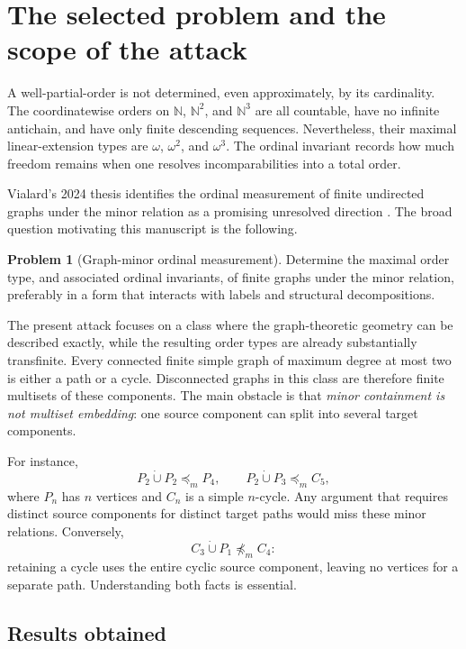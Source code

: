 \documentclass[11pt,letterpaper]{article}
\theoremstyle{plain}
\theoremstyle{definition}
\newtheorem{problem}[problem]{Problem}
\theoremstyle{remark}
\newcommand{\N}{\mathbb N}
\newcommand{\minor}{\preccurlyeq_{\!m}}
\newcommand{\sqgraph}{\mathbin{\dot\cup}}
\begin{document}
\begingroup
\small
\setlength{\parskip}{0pt}
\tableofcontents
\endgroup
\clearpage

\section{The selected problem and the scope of the attack}

A well-partial-order is not determined, even approximately, by its
cardinality. The coordinatewise orders on $\N$, $\N^2$, and $\N^3$ are all
countable, have no infinite antichain, and have only finite descending
sequences. Nevertheless, their maximal linear-extension types are
$\omega$, $\omega^2$, and $\omega^3$. The ordinal invariant records how much
freedom remains when one resolves incomparabilities into a total order.

Vialard's 2024 thesis identifies the ordinal measurement of finite
undirected graphs under the minor relation as a promising unresolved
direction \cite[p.~110]{VialardThesis}. The broad question motivating this
manuscript is the following.

\begin{problem}[Graph-minor ordinal measurement]
Determine the maximal order type, and associated ordinal invariants, of
finite graphs under the minor relation, preferably in a form that interacts
with labels and structural decompositions.
\end{problem}

The present attack focuses on a class where the graph-theoretic geometry
can be described exactly, while the resulting order types are already
substantially transfinite. Every connected finite simple graph of maximum
degree at most two is either a path or a cycle. Disconnected graphs in this
class are therefore finite multisets of these components. The main obstacle
is that \emph{minor containment is not multiset embedding}: one source
component can split into several target components.

For instance,
\[
 P_2\sqgraph P_2\minor P_4,
 \qquad
 P_2\sqgraph P_3\minor C_5,
\]
where $P_n$ has $n$ vertices and $C_n$ is a simple $n$-cycle. Any argument
that requires distinct source components for distinct target paths would
miss these minor relations. Conversely,
\[
 C_3\sqgraph P_1\not\minor C_4:
\]
retaining a cycle uses the entire cyclic source component, leaving no
vertices for a separate path. Understanding both facts is essential.

\subsection{Results obtained}
\end{document}

